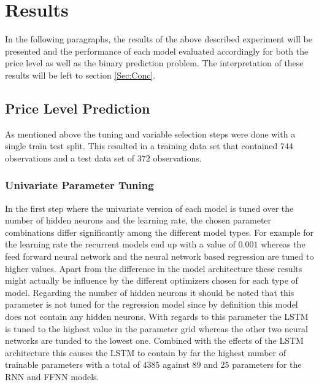 \chapter{Results}
In the following paragraphs, the results of the above described experiment will be presented and the performance of each model evaluated accordingly for both the price level as well as the binary prediction problem. The interpretation of these results will be left to section \ref{Sec:Conc}.
\section{Price Level Prediction}
As mentioned above the tuning and variable selection steps were done with a single train test split. This resulted in a training data set that contained $744$ observations and a test data set of $372$ observations.
\subsection{Univariate Parameter Tuning}
In the first step where the univariate version of each model is tuned over the number of hidden neurons and the learning rate, the chosen parameter combinations differ significantly among the different model types. For example for the learning rate the recurrent models end up with a value of $0.001$ whereas the feed forward neural network and the neural network based regression are tuned to higher values. Apart from the difference in the model architecture these results might actually be influence by the different optimizers chosen for each type of model. Regarding the number of hidden neurons it should be noted that this parameter is not tuned for the regression model since by definition this model does not contain any hidden neurons. With regards to this parameter the LSTM is tuned to the highest value in the parameter grid whereas the other two neural networks are tunded to the lowest one. Combined with the effects of the LSTM architecture this causes the LSTM to contain by far the highest number of trainable parameters with a total of $4385$ against $89$ and $25$ parameters for the RNN and FFNN models.

